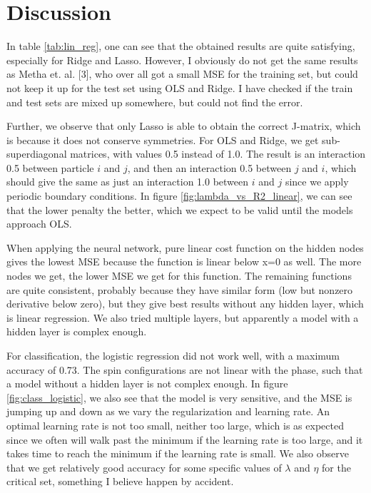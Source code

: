 \section{Discussion} \label{sec:discussion}
In table \eqref{tab:lin_reg}, one can see that the obtained results are quite satisfying, especially for Ridge and Lasso. However, I obviously do not get the same results as Metha et. al. [3], who over all got a small MSE for the training set, but could not keep it up for the test set using OLS and Ridge. I have checked if the train and test sets are mixed up somewhere, but could not find the error.

Further, we observe that only Lasso is able to obtain the correct J-matrix, which is because it does not conserve symmetries. For OLS and Ridge, we get sub-superdiagonal matrices, with values 0.5 instead of 1.0. The result is an interaction 0.5 between particle $i$ and $j$, and then an interaction 0.5 between $j$ and $i$, which should give the same as just an interaction 1.0 between $i$ and $j$ since we apply periodic boundary conditions. In figure \eqref{fig:lambda_vs_R2_linear}, we can see that the lower penalty the better, which we expect to be valid until the models approach OLS. 

When applying the neural network, pure linear cost function on the hidden nodes gives the lowest MSE because the function is linear below x=0 as well. The more nodes we get, the lower MSE we get for this function. The remaining functions are quite consistent, probably because they have similar form (low but nonzero derivative below zero), but they give best results without any hidden layer, which is linear regression. We also tried multiple layers, but apparently a model with a hidden layer is complex enough.
\vspace{1cm}

For classification, the logistic regression did not work well, with a maximum accuracy of 0.73. The spin configurations are not linear with the phase, such that a model without a hidden layer is not complex enough. In figure \eqref{fig:class_logistic}, we also see that the model is very sensitive, and the MSE is jumping up and down as we vary the regularization and learning rate. An optimal learning rate is not too small, neither too large, which is as expected since we often will walk past the minimum if the learning rate is too large, and it takes time to reach the minimum if the learning rate is small. We also observe that we get relatively good accuracy for some specific values of $\lambda$ and $\eta$ for the critical set, something I believe happen by accident.


